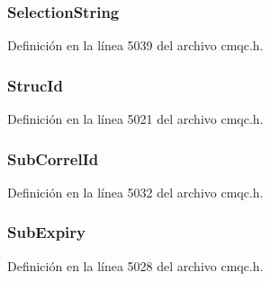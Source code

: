 \subsubsection[{Selection\+String}]{ Selection\+String}\label{structtag_m_q_s_d_ab3a91014a229bd897c17cbd04563bca2}


Definición en la línea 5039 del archivo cmqc.\+h.

\hypertarget{structtag_m_q_s_d_a0530922ca944569b52601d74941f96e4}{}
\subsubsection[{Struc\+Id}]{ Struc\+Id}\label{structtag_m_q_s_d_a0530922ca944569b52601d74941f96e4}


Definición en la línea 5021 del archivo cmqc.\+h.

\hypertarget{structtag_m_q_s_d_a32dcf75a2ce80dd29ed6077b5683fbf5}{}
\subsubsection[{Sub\+Correl\+Id}]{ Sub\+Correl\+Id}\label{structtag_m_q_s_d_a32dcf75a2ce80dd29ed6077b5683fbf5}


Definición en la línea 5032 del archivo cmqc.\+h.

\hypertarget{structtag_m_q_s_d_a87aca8cd75818b045e3504060929eee5}{}
\subsubsection[{Sub\+Expiry}]{ Sub\+Expiry}\label{structtag_m_q_s_d_a87aca8cd75818b045e3504060929eee5}


Definición en la línea 5028 del archivo cmqc.\+h.

\hypertarget{structtag_m_q_s_d_a380ddfc450dd5ceb714a3d818f82c79b}{}
